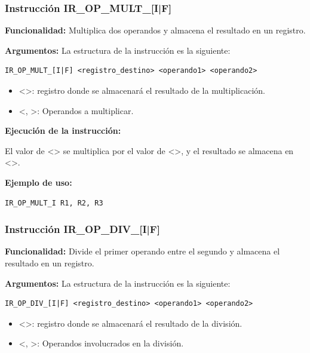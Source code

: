 \subsubsection{Instrucción IR\_OP\_MULT\_[I|F]}\label{subsubsec:IR_OP_MULT}
\noindent
\textbf{Funcionalidad:} Multiplica dos operandos y almacena el resultado en un registro.

\noindent
\textbf{Argumentos:} La estructura de la instrucción es la siguiente:
\begin{verbatim}
IR_OP_MULT_[I|F] <registro_destino> <operando1> <operando2>
\end{verbatim}
\begin{itemize}
    \item <>: registro donde se almacenará el resultado de la multiplicación.
    \item <, >: Operandos a multiplicar.
\end{itemize}

\noindent
\textbf{Ejecución de la instrucción:}
\vspace{0.3cm}

\noindent
El valor de <> se multiplica por el valor de <>, y el resultado se almacena en <>.
\vspace{0.3cm}

\noindent
\textbf{Ejemplo de uso:}
\begin{verbatim}
IR_OP_MULT_I R1, R2, R3
\end{verbatim}

\subsubsection{Instrucción IR\_OP\_DIV\_[I|F]}\label{subsubsec:IR_OP_DIV}
\noindent
\textbf{Funcionalidad:} Divide el primer operando entre el segundo y almacena el resultado en un registro.

\noindent
\textbf{Argumentos:} La estructura de la instrucción es la siguiente:
\begin{verbatim}
IR_OP_DIV_[I|F] <registro_destino> <operando1> <operando2>
\end{verbatim}
\begin{itemize}
    \item <>: registro donde se almacenará el resultado de la división.
    \item <, >: Operandos involucrados en la división.
\end{itemize}

